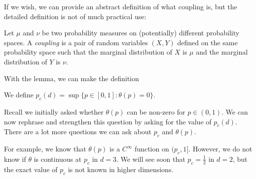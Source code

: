 \documentclass[a4paper]{article}
\begin{document}
If we wish, we can provide an abstract definition of what coupling is, but the detailed definition is not of much practical use:
\begin{defi}[Coupling]
  Let $\mu$ and $\nu$ be two probability measures on (potentially) different probability spaces. A \emph{coupling} is a pair of random variables $(X, Y)$ defined on the same probability space such that the marginal distribution of $X$ is $\mu$ and the marginal distribution of $Y$ is $\nu$.
\end{defi}

%
%
%
%

With the lemma, we can make the definition
\begin{defi}
  We define $p_c(d) = \sup \{p \in [0, 1]: \theta(p) = 0\}$.
\end{defi}

Recall we initially asked whether $\theta(p)$ can be non-zero for $p \in (0, 1)$. We can now rephrase and strengthen this question by asking for the value of $p_c(d)$. There are a lot more questions we can ask about $p_c$ and $\theta(p)$.

For example, we know that $\theta(p)$ is a $C^\infty$ function on $(p_c, 1]$. However, we do not know if $\theta$ is continuous at $p_c$ in $d = 3$. We will see soon that $p_c = \frac{1}{2}$ in $d = 2$, but the exact value of $p_c$ is not known in higher dimensions.
\end{document}
